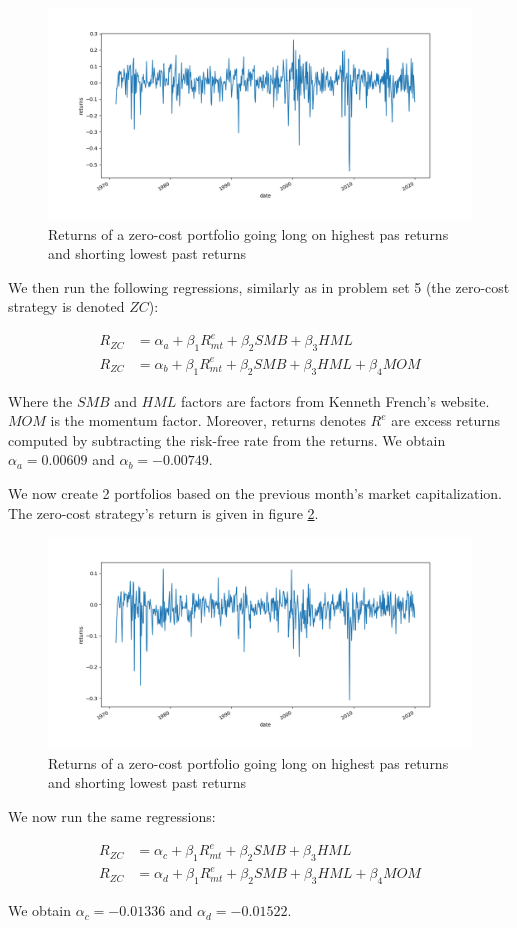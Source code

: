 \documentclass[10pt]{article}
\begin{document}
\begin{figure}[h]
    \centering
    \includegraphics[scale=0.5]{ps8_ex2_plot1.png}
    \caption{Returns of a zero-cost portfolio going  long on highest pas returns and shorting lowest past returns}
    \label{ps8_ex2_plot1}    
\end{figure}

We then run the following regressions, similarly as in problem set 5 (the zero-cost strategy is denoted $ZC$):

\begin{align*}	
	R_{ZC} &= \alpha_a +  \beta_1 R^e_{mt} + \beta_2 SMB + \beta_3 HML \\
	R_{ZC}  &= \alpha_b + \beta_1 R^e_{mt} + \beta_2 SMB + \beta_3 HML + \beta_4 MOM
\end{align*}  

Where the $SMB$ and $HML$ factors are factors from Kenneth French’s website. $MOM$ is the momentum factor. Moreover, returns denotes $R^e$ are excess returns computed by subtracting the risk-free rate from the returns. We obtain $\alpha_{a} = 0.00609$ and $\alpha_{b} = -0.00749$.   
   
\bigbreak

We now create 2 portfolios based on the previous month's market capitalization.  The zero-cost strategy's return is given in figure \ref{ps8_ex2_plot2}.

\begin{figure}[h]
    \centering
    \includegraphics[scale=0.5]{ps8_ex2_plot2.png}
    \caption{Returns of a zero-cost portfolio going  long on highest pas returns and shorting lowest past returns}
    \label{ps8_ex2_plot2}    
\end{figure}

We now run the same regressions:

\begin{align*}	
	R_{ZC} &= \alpha_c +  \beta_1 R^e_{mt}  + \beta_2 SMB + \beta_3 HML \\
	R_{ZC}  &= \alpha_d + \beta_1 R^e_{mt} + \beta_2 SMB + \beta_3 HML + \beta_4 MOM
\end{align*}  

We obtain $\alpha_{c} = -0.01336$ and $\alpha_{d} = -0.01522$.
   
\end{document}
